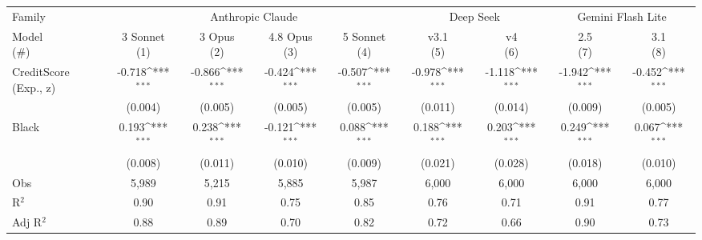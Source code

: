 {
\def\sym#1{\ifmmode^{#1}\else\(^{#1}\)\fi}
\begin{tabular}{l*{8}{c}}
\toprule
Family          &\multicolumn{4}{c}{Anthropic Claude}                                       &\multicolumn{2}{c}{Deep Seek}        &\multicolumn{2}{c}{Gemini Flash Lite}\\\cmidrule(lr){2-5}\cmidrule(lr){6-7}\cmidrule(lr){8-9}
\shortstack{\vphantom{Model Opus}Model\\(\#)}&\shortstack{\vphantom{Model Opus}3 Sonnet\\(1)}         &\shortstack{\vphantom{Model Opus}3 Opus  \\(2)}         &\shortstack{\vphantom{Model Opus}4.8 Opus  \\(3)}         &\shortstack{\vphantom{Model Opus}5 Sonnet\\(4)}         &\shortstack{\vphantom{Model Opus}v3.1  \\(5)}         &\shortstack{\vphantom{Model Opus}v4    \\(6)}         &\shortstack{\vphantom{Model Opus}2.5   \\(7)}         &\shortstack{\vphantom{Model Opus}3.1   \\(8)}         \\
\midrule
CreditScore (Exp., z)&   -0.718\sym{***}&   -0.866\sym{***}&   -0.424\sym{***}&   -0.507\sym{***}&   -0.978\sym{***}&   -1.118\sym{***}&   -1.942\sym{***}&   -0.452\sym{***}\\
                &  (0.004)         &  (0.005)         &  (0.005)         &  (0.005)         &  (0.011)         &  (0.014)         &  (0.009)         &  (0.005)         \\
Black           &    0.193\sym{***}&    0.238\sym{***}&   -0.121\sym{***}&    0.088\sym{***}&    0.188\sym{***}&    0.203\sym{***}&    0.249\sym{***}&    0.067\sym{***}\\
                &  (0.008)         &  (0.011)         &  (0.010)         &  (0.009)         &  (0.021)         &  (0.028)         &  (0.018)         &  (0.010)         \\
\midrule
Obs             &    5,989         &    5,215         &    5,885         &    5,987         &    6,000         &    6,000         &    6,000         &    6,000         \\
R$^2$           &     0.90         &     0.91         &     0.75         &     0.85         &     0.76         &     0.71         &     0.91         &     0.77         \\
Adj R$^2$       &     0.88         &     0.89         &     0.70         &     0.82         &     0.72         &     0.66         &     0.90         &     0.73         \\

\end{tabular}}
